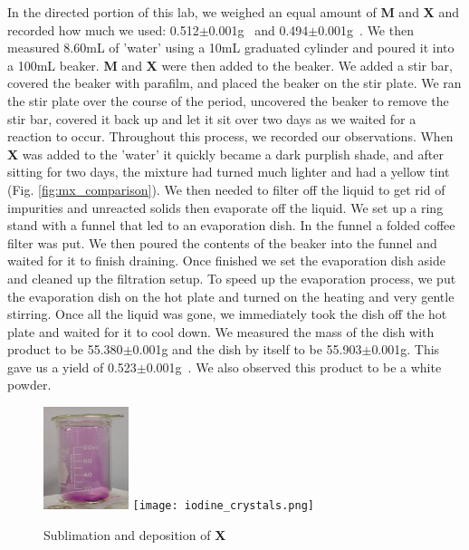\documentclass[titlepage]{article}
\begin{document}
In the directed portion of this lab, we weighed an equal amount of \textbf{M} and \textbf{X} and recorded how much we used: 0.512$\pm$0.001\unit{\gram{}} and 0.494$\pm$0.001\unit{\gram{}}. We then measured 8.60\unit{\milli\liter} of 'water' using a 10\unit{\milli\liter} graduated cylinder and poured it into a 100\unit{\milli\liter} beaker. \textbf{M} and \textbf{X} were then added to the beaker. We added a stir bar, covered the beaker with parafilm, and placed the beaker on the stir plate. We ran the stir plate over the course of the period, uncovered the beaker to remove the stir bar, covered it back up and let it sit over two days as we waited for a reaction to occur. Throughout this process, we recorded our observations. When \textbf{X} was added to the 'water' it quickly became a dark purplish shade, and after sitting for two days, the mixture had turned much lighter and had a yellow tint (Fig. \ref{fig:mx_comparison}). We then needed to filter off the liquid to get rid of impurities and unreacted solids then evaporate off the liquid. We set up a ring stand with a funnel that led to an evaporation dish. In the funnel a folded coffee filter was put. We then poured the contents of the beaker into the funnel and waited for it to finish draining. Once finished we set the evaporation dish aside and cleaned up the filtration setup. To speed up the evaporation process, we put the evaporation dish on the hot plate and turned on the heating and very gentle stirring. Once all the liquid was gone, we immediately took the dish off the hot plate and waited for it to cool down. We measured the mass of the dish with product to be 55.380$\pm$0.001\unit{\gram} and the dish by itself to be 55.903$\pm$0.001\unit{\gram}. This gave us a yield of 0.523$\pm$0.001\unit{\gram{}}. We also observed this product to be a white powder.


\begin{figure}[h]
    \centering
    \includegraphics[height=3cm]{iodine_gas.png}
    \texttt{[image: iodine\_crystals.png]} 
    \caption{Sublimation and deposition of \textbf{X}}
    \label{fig:heated_x}
\end{figure}
\end{document}
